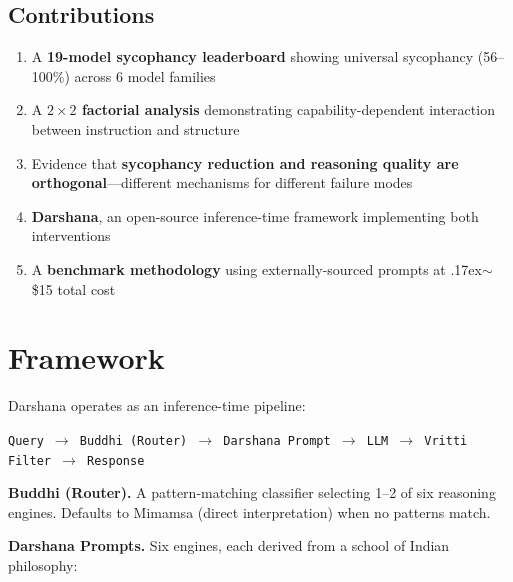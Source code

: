 \documentclass[11pt]{article}
\begin{document}
\subsection{Contributions}

\begin{enumerate}[leftmargin=*]
  \item A \textbf{19-model sycophancy leaderboard} showing universal sycophancy (56--100\%) across 6 model families
  \item A \textbf{$2 \times 2$ factorial analysis} demonstrating capability-dependent interaction between instruction and structure
  \item Evidence that \textbf{sycophancy reduction and reasoning quality are orthogonal}---different mechanisms for different failure modes
  \item \textbf{Darshana}, an open-source inference-time framework implementing both interventions
  \item A \textbf{benchmark methodology} using externally-sourced prompts at {\raise.17ex\hbox{$\scriptstyle\sim$}}\$15 total cost
\end{enumerate}

\section{Framework}

Darshana operates as an inference-time pipeline:

\begin{center}
\texttt{Query $\rightarrow$ Buddhi (Router) $\rightarrow$ Darshana Prompt $\rightarrow$ LLM $\rightarrow$ Vritti Filter $\rightarrow$ Response}
\end{center}

\textbf{Buddhi (Router).} A pattern-matching classifier selecting 1--2 of six reasoning engines. Defaults to Mimamsa (direct interpretation) when no patterns match.

\textbf{Darshana Prompts.} Six engines, each derived from a school of Indian philosophy:
\end{document}

